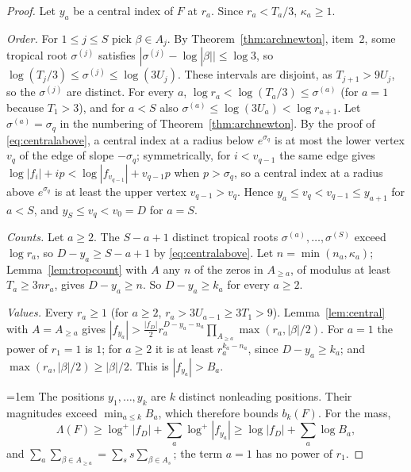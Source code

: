 \documentclass[11pt]{article}
\begin{document}
\begin{proof}
Let $y_a$ be a central index of $F$ at $r_a$.  Since $r_a<T_a/3$,
$\kappa_a\ge1$.

\emph{Order.}  For $1\le j\le S$ pick $\beta\in A_j$.  By
Theorem~\ref{thm:archnewton}, item~2, some tropical root $\sigma^{(j)}$
satisfies $|\sigma^{(j)}-\log|\beta||\le\log3$, so
$\log(T_j/3)\le\sigma^{(j)}\le\log(3U_j)$.  These intervals are disjoint, as
$T_{j+1}>9U_j$, so the $\sigma^{(j)}$ are distinct.  For every $a$,
$\log r_a<\log(T_a/3)\le\sigma^{(a)}$ (for $a=1$ because $T_1>3$), and for
$a<S$ also $\sigma^{(a)}\le\log(3U_a)<\log r_{a+1}$.  Let
$\sigma^{(a)}=\sigma_q$ in the numbering of Theorem~\ref{thm:archnewton}.  By the
proof of \eqref{eq:centralabove}, a central index at a
radius below $e^{\sigma_q}$ is at most the lower vertex $v_q$ of the edge of
slope $-\sigma_q$; symmetrically, for $i<v_{q-1}$ the same edge gives
$\log|f_i|+ip<\log|f_{v_{q-1}}|+v_{q-1}p$ when $p>\sigma_q$, so a central
index at a radius above $e^{\sigma_q}$ is at least the upper vertex
$v_{q-1}>v_q$.  Hence $y_a\le v_q<v_{q-1}\le y_{a+1}$ for $a<S$, and
$y_S\le v_q<v_0=D$ for $a=S$.

\emph{Counts.}  Let $a\ge2$.  The $S-a+1$ distinct tropical roots
$\sigma^{(a)},\ldots,\sigma^{(S)}$ exceed $\log r_a$, so
$D-y_a\ge S-a+1$ by \eqref{eq:centralabove}.  Let $n=\min(n_a,\kappa_a)$;
Lemma~\ref{lem:tropcount} with $A$ any $n$ of the zeros in $A_{\ge a}$, of
modulus at least $T_a\ge3nr_a$, gives $D-y_a\ge n$.  So $D-y_a\ge k_a$ for every $a\ge2$.

\emph{Values.}  Every $r_a\ge1$ (for $a\ge2$, $r_a>3U_{a-1}\ge3T_1>9$).
Lemma~\ref{lem:central} with $A=A_{\ge a}$ gives
$|f_{y_a}|>\frac{|f_D|}2r_a^{D-y_a-n_a}\prod_{A_{\ge a}}\max(r_a,|\beta|/2)$.
For $a=1$ the power of $r_1=1$ is $1$; for $a\ge2$ it is at least
$r_a^{k_a-n_a}$, since $D-y_a\ge k_a$; and $\max(r_a,|\beta|/2)\ge|\beta|/2$.
This is $|f_{y_a}|>B_a$.

\begingroup
\emergencystretch=1em
The positions $y_1,\ldots,y_k$ are $k$ distinct nonleading positions.  Their
magnitudes exceed $\min_{a\le k}B_a$, which therefore bounds $b_k(F)$.  For
the mass,
\[
  \Lambda(F)\ge\log^+|f_D|+\sum_a\log^+|f_{y_a}|
  \ge\log|f_D|+\sum_a\log B_a,
\]
and $\sum_a\sum_{\beta\in A_{\ge a}}=\sum_ss\sum_{\beta\in A_s}$; the term
$a=1$ has no power of $r_1$.
\par
\endgroup
\end{proof}
\end{document}
